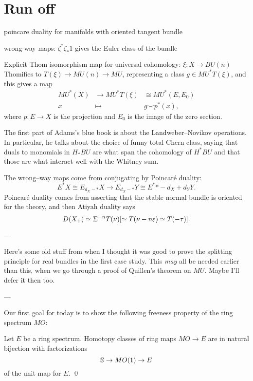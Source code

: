 \section*{Run off}









poincare duality for manifolds with oriented tangent bundle

wrong-way maps: $\zeta^* \zeta_* 1$ gives the Euler class of the bundle

Explicit Thom isomorphism map for universal cohomology: $\xi: X \to BU(n)$ Thomifies to $T(\xi) \to MU(n) \to MU$, representing a class $g \in MU^* T(\xi)$, and this gives a map
\begin{align*}
MU^*(X) & \to MU^* T(\xi) & \cong MU^*(E, E_0)\\
x & \mapsto & g \smile p^*(x),
\end{align*}
where $p: E \to X$ is the projection and $E_0$ is the image of the zero section.

The first part of Adams's blue book is about the Landweber--Novikov operations.  In particular, he talks about the choice of funny total Chern class, saying that duals to monomials in $H_* BU$ are what span the cohomology of $H^* BU$ and that those are what interact well with the Whitney sum.

The wrong--way maps come from conjugating by Poincar\'e duality: \[E^* X \cong E_{d_X-*} X \to E_{d_X-*} Y \cong E^*{*-d_X+d_Y} Y.\]  Poincar\'e duality comes from asserting that the stable normal bundle is oriented for the theory, and then Atiyah duality says \[D(X_+) \simeq \Susp^{-n} T(\nu) [\simeq T(\nu - n\eps) \simeq T(-\tau)]. \]

---

Here's some old stuff from when I thought it was good to prove the splitting principle for real bundles in the first case study.  This \emph{may} all be needed earlier than this, when we go through a proof of Quillen's theorem on $MU$.  Maybe I'll defer it then too.

---

Our first goal for today is to show the following freeness property of the ring spectrum $MO$:
\begin{theorem}
Let $E$ be a ring spectrum.  Homotopy classes of ring maps $MO \to E$ are in natural bijection with factorizations \[\S \to MO(1) \to E\] of the unit map for $E$. \qed
\end{theorem}

